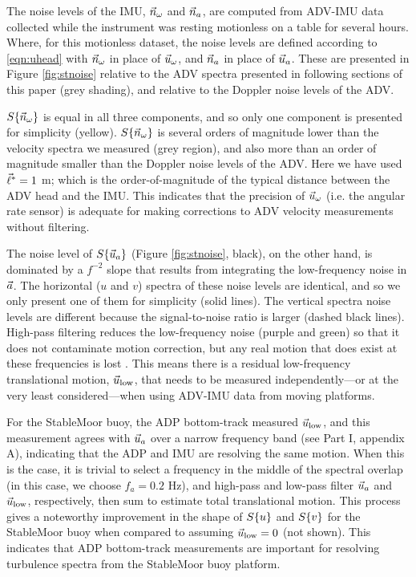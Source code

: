 The noise levels of the IMU, $\vec{n}_{\omega}$ and $\vec{n}_{a}$, are computed from ADV-IMU data collected while the instrument was resting motionless on a table for several hours. Where, for this motionless dataset, the noise levels are defined according to \eqref{eqn:uhead} with $\vec{n}_{\omega}$ in place of $\vec{u}_\omega$, and $\vec{n}_{a}$ in place of $\vec{u}_a$.  These are presented in Figure \ref{fig:stnoise} relative to the ADV spectra presented in following sections of this paper (grey shading), and relative to the Doppler noise levels of the ADV.

$S\{\vec{n}_{\omega}\}$ is equal in all three components, and so only one component is presented for simplicity (yellow). $S\{\vec{n}_{\omega}\}$ is several orders of magnitude lower than the velocity spectra we measured (grey region), and also more than an order of magnitude smaller than the Doppler noise levels of the ADV. Here we have used $\vec{\ell}^*=1$ m; which is the order-of-magnitude of the typical distance between the ADV head and the IMU. This indicates that the precision of $\vec{u}_\omega$ (i.e. the angular rate sensor) is adequate for making corrections to ADV velocity measurements without filtering.

The noise level of $S\{\vec{u}_a\}$ (Figure \ref{fig:stnoise}, black), on the other hand, is dominated by a $f^{-2}$ slope that results from integrating the low-frequency noise in ${\vec{a}}$. The horizontal ($u$ and $v$) spectra of these noise levels are identical, and so we only present one of them for simplicity (solid lines). The vertical spectra noise levels are different because the signal-to-noise ratio is larger (dashed black lines). High-pass filtering reduces the low-frequency noise (purple and green) so that it does not contaminate motion correction, but any real motion that does exist at these frequencies is lost \cite[]{EgelandPhD2014, VanZwieten++2015}. This means there is a residual low-frequency translational motion, $\vec{u}_\mathrm{low}$, that needs to be measured independently---or at the very least considered---when using ADV-IMU data from moving platforms. 

For the StableMoor buoy, the ADP bottom-track measured $\vec{u}_\mathrm{low}$, and this measurement agrees with $\vec{u}_a$ over a narrow frequency band (see Part I, appendix A), indicating that the ADP and IMU are resolving the same motion. When this is the case, it is trivial to select a frequency in the middle of the spectral overlap (in this case, we choose $f_a=0.2$ Hz), and high-pass and low-pass filter $\vec{u}_a$ and $\vec{u}_\mathrm{low}$, respectively, then sum to estimate total translational motion. This process gives a noteworthy improvement in the shape of $S\{u\}$ and $S\{v\}$ for the StableMoor buoy when compared to assuming $\vec{u}_\mathrm{low}=0$ (not shown). This indicates that ADP bottom-track measurements are important for resolving turbulence spectra from the StableMoor buoy platform. 

